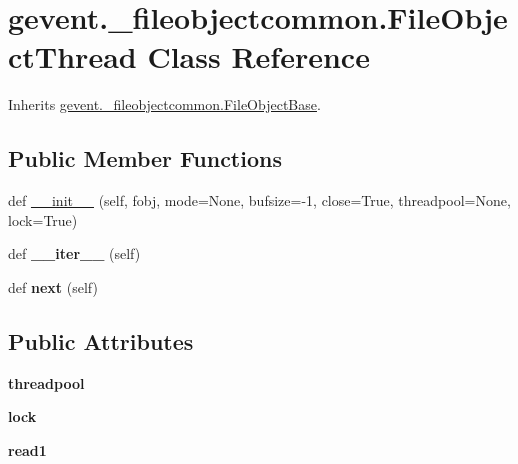 \hypertarget{classgevent_1_1__fileobjectcommon_1_1_file_object_thread}{}\section{gevent.\+\_\+fileobjectcommon.\+File\+Object\+Thread Class Reference}
\label{classgevent_1_1__fileobjectcommon_1_1_file_object_thread}


Inherits \hyperlink{classgevent_1_1__fileobjectcommon_1_1_file_object_base}{gevent.\+\_\+fileobjectcommon.\+File\+Object\+Base}.

\subsection*{Public Member Functions}
\begin{DoxyCompactItemize}
\item 
def \hyperlink{classgevent_1_1__fileobjectcommon_1_1_file_object_thread_ae43a8e09d2632ab8af16333ff40bef24}{\+\_\+\+\_\+init\+\_\+\+\_\+} (self, fobj, mode=None, bufsize=-\/1, close=True, threadpool=None, lock=True)
\item 
\mbox{\label{classgevent_1_1__fileobjectcommon_1_1_file_object_thread_a545813c91f135d9afd58c15681199a4d}} 
def {\bfseries \+\_\+\+\_\+iter\+\_\+\+\_\+} (self)
\item 
\mbox{\label{classgevent_1_1__fileobjectcommon_1_1_file_object_thread_a7bf5e1677fc5fcf3e1d671180389de2f}} 
def {\bfseries next} (self)
\end{DoxyCompactItemize}
\subsection*{Public Attributes}
\begin{DoxyCompactItemize}
\item 
\mbox{\label{classgevent_1_1__fileobjectcommon_1_1_file_object_thread_a629fe1642a67c4d25673c8b161aa64a4}} 
{\bfseries threadpool}
\item 
\mbox{\label{classgevent_1_1__fileobjectcommon_1_1_file_object_thread_a993af96d119c58ce2bb7cf4091590fc4}} 
{\bfseries lock}
\item 
\mbox{\label{classgevent_1_1__fileobjectcommon_1_1_file_object_thread_a478c4369bfc3babb2d5f37b9627cff79}} 
{\bfseries read1}
\end{DoxyCompactItemize}


